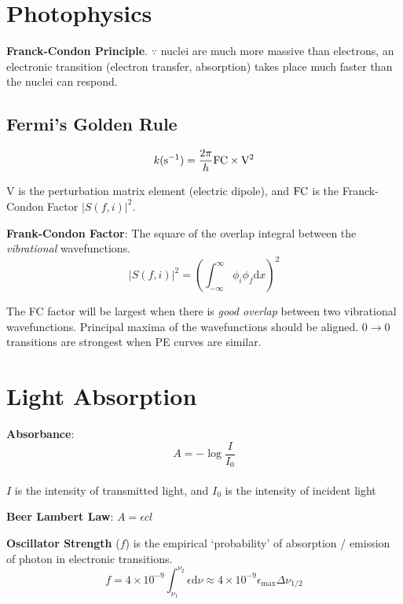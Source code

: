 \section{Photophysics}
\textbf{Franck-Condon Principle}. $\because$ nuclei are much more massive than electrons,
an electronic transition (electron transfer, absorption) takes place much faster than the nuclei can respond.

\subsection*{Fermi's Golden Rule}
$$k(\mathrm{s}^{-1}) = \frac{2\pi}{h}\ce{FC} \times \mathrm{V}^2$$

$\mathrm{V}$ is the perturbation matrix element (electric dipole), and $\ce{FC}$ is the Franck-Condon Factor $|S(f,i)|^2$.
\vspace{\baselineskip}

\textbf{Frank-Condon Factor}: The square of the overlap integral between the \textit{vibrational} wavefunctions.
$$|S(f,i)|^2 = \left( \int^{\infty}_{-\infty}\phi_i\phi_f \mathrm{d}x \right)^2$$

The FC factor will be largest when there is \textit{good overlap} between two vibrational wavefunctions. Principal maxima of
the wavefunctions should be aligned. $0 \rightarrow 0$ transitions are strongest when PE curves are similar.
\vspace{\baselineskip}

\section{Light Absorption}
\textbf{Absorbance}: $$ A = -\log \frac{I}{I_0}$$ \\
$I$ is the intensity of transmitted light, and $I_0$ is the intensity of incident light

\vspace{\baselineskip}

\textbf{Beer Lambert Law}: $A = \epsilon cl$
\vspace{\baselineskip}

\textbf{Oscillator Strength} ($f$) is the empirical `probability' of absorption / emission of photon in electronic transitions.
\begin{equation*}
  f = 4 \times 10^{-9} \int_{\nu_1}^{\nu_2}\epsilon \mathrm{d}\nu \approx 4 \times 10^{-9} \epsilon_{\mathrm{max}} \Delta \nu_{1/2}
\end{equation*}

